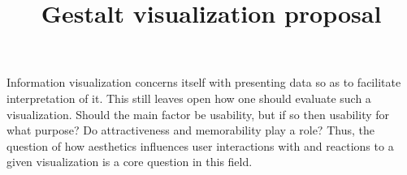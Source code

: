 \documentclass[12pt, twocolumn]{article}
\title{\vspace{-.5in}Gestalt visualization proposal}
\author{} %
\date{\vspace{-.7in}}
\begin{document}
\maketitle

Information visualization concerns itself with presenting data so as to facilitate interpretation of it. 
This still leaves open how one should evaluate such a visualization. 
Should the main factor be usability, but if so then usability for what purpose?
Do attractiveness and memorability play a role?
Thus, the question of how aesthetics influences user interactions with and reactions to a given visualization is a core question in this field. 
\\
\end{document}
